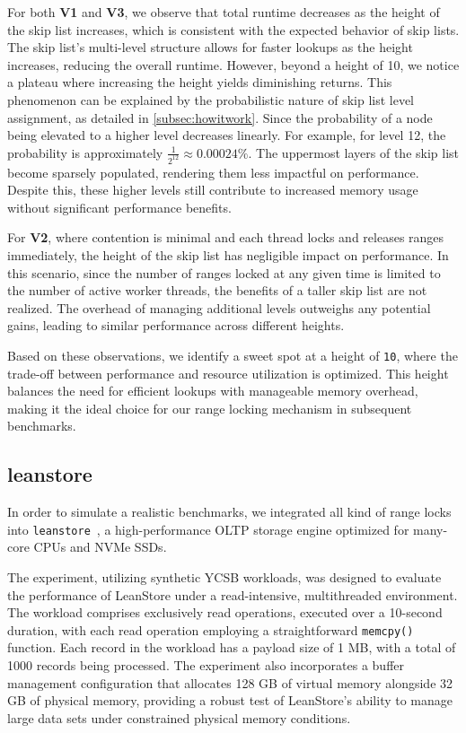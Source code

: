 For both \textbf{V1} and \textbf{V3}, we observe that total runtime decreases as the height of the skip list increases, which is consistent with the expected behavior of skip lists. The skip list's multi-level structure allows for faster lookups as the height increases, reducing the overall runtime. However, beyond a height of 10, we notice a plateau where increasing the height yields diminishing returns. This phenomenon can be explained by the probabilistic nature of skip list level assignment, as detailed in \ref{subsec:howitwork}. Since the probability of a node being elevated to a higher level decreases linearly. For example, for level 12, the probability is approximately \(\frac{1}{2^{12}} \approx 0.00024\%\). The uppermost layers of the skip list become sparsely populated, rendering them less impactful on performance. Despite this, these higher levels still contribute to increased memory usage without significant performance benefits.

For \textbf{V2}, where contention is minimal and each thread locks and releases ranges immediately, the height of the skip list has negligible impact on performance. In this scenario, since the number of ranges locked at any given time is limited to the number of active worker threads, the benefits of a taller skip list are not realized. The overhead of managing additional levels outweighs any potential gains, leading to similar performance across different heights.

Based on these observations, we identify a sweet spot at a height of \texttt{10}, where the trade-off between performance and resource utilization is optimized. This height balances the need for efficient lookups with manageable memory overhead, making it the ideal choice for our range locking mechanism in subsequent benchmarks.

\subsection{leanstore}

In order to simulate a realistic benchmarks, we integrated all kind of range locks into \texttt{leanstore}~\parencite{leis2018leanstore}, a high-performance OLTP storage engine optimized for many-core CPUs and NVMe SSDs. 

The experiment, utilizing synthetic YCSB workloads, was designed to evaluate the performance of LeanStore under a read-intensive, multithreaded environment. The workload comprises exclusively read operations, executed over a 10-second duration, with each read operation employing a straightforward \texttt{memcpy()} function. Each record in the workload has a payload size of 1 MB, with a total of 1000 records being processed. The experiment also incorporates a buffer management configuration that allocates 128 GB of virtual memory alongside 32 GB of physical memory, providing a robust test of LeanStore's ability to manage large data sets under constrained physical memory conditions.


